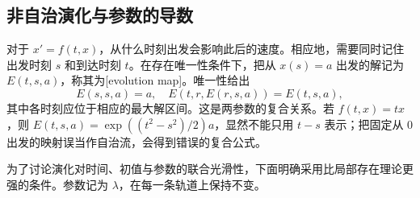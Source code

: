 \subsection{非自治演化与参数的导数}
\label{b2:subsec:ode-evolution-parameters}

对于 \(x'=f(t,x)\)，从什么时刻出发会影响此后的速度。相应地，需要同时记住出发时刻 \(s\) 和到达时刻 \(t\)。在存在唯一性条件下，把从 \(x(s)=a\) 出发的解记为 \(E(t,s,a)\)，称其为[evolution map]。唯一性给出
\[
 E(s,s,a)=a,\quad
 E(t,r,E(r,s,a))=E(t,s,a),
\]
其中各时刻应位于相应的最大解区间。这是两参数的复合关系。若 \(f(t,x)=tx\)，则 \(E(t,s,a)=\exp((t^2-s^2)/2)a\)，显然不能只用 \(t-s\) 表示；把固定从 \(0\) 出发的映射误当作自治流，会得到错误的复合公式。

\ProseParagraphBreak

为了讨论演化对时间、初值与参数的联合光滑性，下面明确采用比局部存在理论更强的条件。参数记为 \(\lambda\)，在每一条轨道上保持不变。

